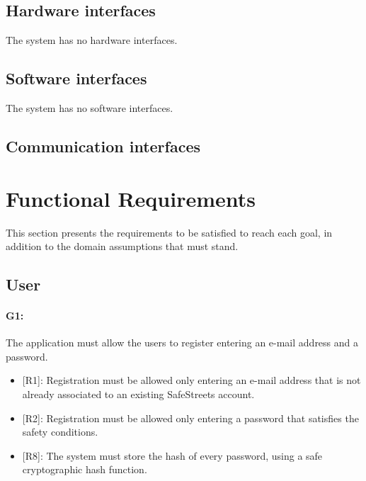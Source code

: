 \documentclass[12pt,a4paper]{report}
\begin{document}
		\subsection{Hardware interfaces}
	The system has no hardware interfaces.
		\subsection{Software interfaces}
	The system has no software interfaces.
		\subsection{Communication interfaces}
	\section{Functional Requirements}
	This section presents the requirements to be satisfied to reach each goal, in addition to the domain assumptions that must stand.
		\subsection{User}
			\paragraph {G1:} The application must allow the users to register entering an e-mail address and a password.
		\begin{itemize}
			\item{[R1]:} Registration must be allowed only entering an e-mail address that is not already associated to an existing SafeStreets account.
			\item{[R2]:} Registration must be allowed only entering a password that satisfies the safety conditions.
			\item{[R8]:} The system must store the hash of every password, using a safe cryptographic hash function.
		\end{itemize}
\end{document}
